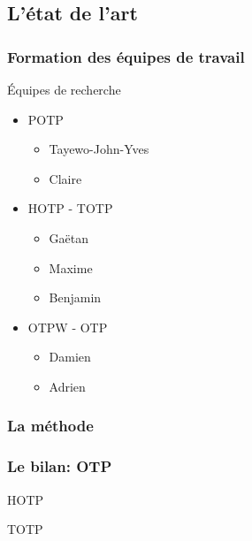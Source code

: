 \documentclass[xcolor=table]{beamer}
\begin{document}
\subsection{L'état de l'art}
\begin{frame}
\frametitle{Formation des équipes de travail}
\begin{block}{Équipes de recherche}
  \begin{itemize}
    \item POTP
    \begin{itemize}
      \item Tayewo-John-Yves 
      \item Claire 
    \end{itemize}
    \item HOTP - TOTP
    \begin{itemize}
      \item Gaëtan 
      \item Maxime 
      \item Benjamin 
    \end{itemize}
    \item OTPW - OTP
    \begin{itemize}
      \item Damien 
      \item Adrien 
    \end{itemize}
  \end{itemize}
\end{block}
\end{frame}

\begin{frame}
\frametitle{La méthode}
\end{frame}

\begin{frame}
\frametitle{Le bilan: OTP}
\begin{block}{HOTP}

\end{block}
\begin{block}{TOTP}

\end{block}
\end{frame}
\end{document}
